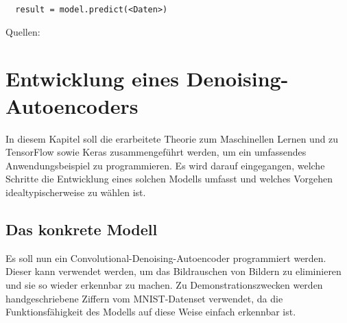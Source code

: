 \begin{verbatim}
  result = model.predict(<Daten>)
\end{verbatim}
\para{}
Quellen: \cite{net:keras_docs} \cite{net:tf_docs}



\chapter{Entwicklung eines Denoising-Autoencoders}
In diesem Kapitel soll die erarbeitete Theorie zum Maschinellen Lernen und zu
TensorFlow sowie Keras zusammengeführt werden, um ein umfassendes
Anwendungsbeispiel zu programmieren.
Es wird darauf eingegangen, welche Schritte die
Entwicklung eines solchen Modells umfasst und welches Vorgehen
idealtypischerweise zu wählen ist.

\section{Das konkrete Modell}
Es soll nun ein Convolutional-Denoising-Autoencoder programmiert werden.
Dieser kann verwendet werden, um das Bildrauschen von Bildern zu eliminieren und
sie so wieder erkennbar zu machen.
Zu Demonstrationszwecken werden handgeschriebene Ziffern vom MNIST-Datenset
verwendet, da die Funktionsfähigkeit des Modells auf diese Weise einfach
erkennbar ist.



